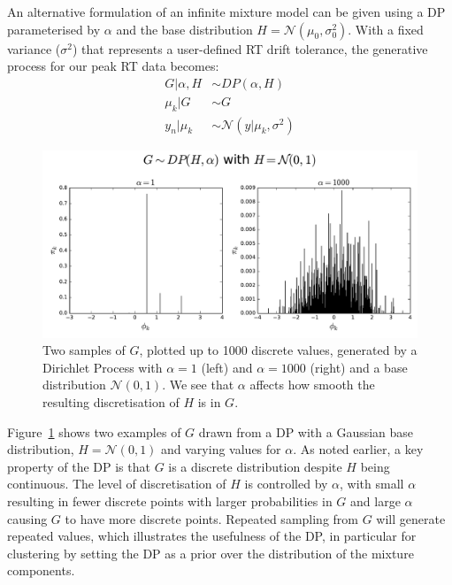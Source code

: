 An alternative formulation of an infinite mixture model can be given using a DP parameterised by $\alpha$ and the base distribution $H=\mathcal{N}(\mu_0, \sigma_0^2)$. With a fixed variance ($\sigma^2$) that represents a user-defined RT drift tolerance, the generative process for our peak RT data becomes:
\begin{equation}
\begin{aligned}
G \vert \alpha, H  &\sim DP(\alpha, H) \\
\mu_k \vert G     &\sim G \\
y_n \vert \mu_k  &\sim \mathcal{N}(y \vert \mu_k, \sigma^2)
\end{aligned}
\label{eq:background-infinite-mixture-dp}
\end{equation}

\begin{figure}
\noindent \begin{centering}
\includegraphics[width=1.0\textwidth]{03-machine-learning/figures/dp_samples_stick.pdf}
\par\end{centering}
\caption{\label{fig:g-from-dp-stick}Two samples of $G$, plotted up to 1000 discrete values, generated by a Dirichlet Process with $\alpha=1$ (left) and $\alpha=1000$ (right) and a base distribution $\mathcal{N}(0, 1)$. We see that $\alpha$ affects how smooth the resulting discretisation of $H$ is in $G$.}
\end{figure}

Figure~\ref{fig:g-from-dp-stick} shows two examples of $G$ drawn from a DP with a Gaussian base distribution, $H=\mathcal{N}(0, 1)$ and varying values for $\alpha$. As noted earlier, a key property of the DP is that $G$ is a discrete distribution despite $H$ being continuous. The level of discretisation of $H$ is controlled by $\alpha$, with small $\alpha$ resulting in fewer discrete points with larger probabilities in $G$ and large $\alpha$ causing $G$ to have more discrete points. Repeated sampling from $G$ will generate repeated values, which illustrates the usefulness of the DP, in particular for clustering by setting the DP as a prior over the distribution of the mixture components. 

